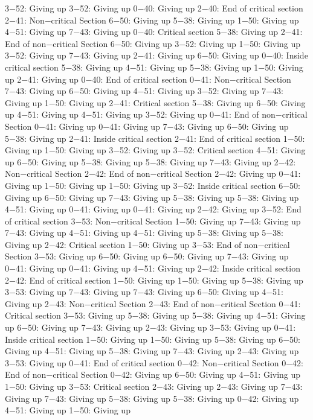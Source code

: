 3−52: Giving up
3−52: Giving up
0−40: Giving up
2−40: End of critical section
2−41: Non−critical Section
6−50: Giving up
5−38: Giving up
1−50: Giving up
4−51: Giving up
7−43: Giving up
0−40: Critical section
5−38: Giving up
2−41: End of non−critical Section
6−50: Giving up
3−52: Giving up
1−50: Giving up
3−52: Giving up
7−43: Giving up
2−41: Giving up
6−50: Giving up
0−40: Inside critical section
5−38: Giving up
4−51: Giving up
5−38: Giving up
1−50: Giving up
2−41: Giving up
0−40: End of critical section
0−41: Non−critical Section
7−43: Giving up
6−50: Giving up
4−51: Giving up
3−52: Giving up
7−43: Giving up
1−50: Giving up
2−41: Critical section
5−38: Giving up
6−50: Giving up
4−51: Giving up
4−51: Giving up
3−52: Giving up
0−41: End of non−critical Section
0−41: Giving up
0−41: Giving up
7−43: Giving up
6−50: Giving up
5−38: Giving up
2−41: Inside critical section
2−41: End of critical section
1−50: Giving up
1−50: Giving up
3−52: Giving up
3−52: Critical section
4−51: Giving up
6−50: Giving up
5−38: Giving up
5−38: Giving up
7−43: Giving up
2−42: Non−critical Section
2−42: End of non−critical Section
2−42: Giving up
0−41: Giving up
1−50: Giving up
1−50: Giving up
3−52: Inside critical section
6−50: Giving up
6−50: Giving up
7−43: Giving up
5−38: Giving up
5−38: Giving up
4−51: Giving up
0−41: Giving up
0−41: Giving up
2−42: Giving up
3−52: End of critical section
3−53: Non−critical Section
1−50: Giving up
7−43: Giving up
7−43: Giving up
4−51: Giving up
4−51: Giving up
5−38: Giving up
5−38: Giving up
2−42: Critical section
1−50: Giving up
3−53: End of non−critical Section
3−53: Giving up
6−50: Giving up
6−50: Giving up
7−43: Giving up
0−41: Giving up
0−41: Giving up
4−51: Giving up
2−42: Inside critical section
2−42: End of critical section
1−50: Giving up
1−50: Giving up
5−38: Giving up
3−53: Giving up
7−43: Giving up
7−43: Giving up
6−50: Giving up
4−51: Giving up
2−43: Non−critical Section
2−43: End of non−critical Section
0−41: Critical section
3−53: Giving up
5−38: Giving up
5−38: Giving up
4−51: Giving up
6−50: Giving up
7−43: Giving up
2−43: Giving up
3−53: Giving up
0−41: Inside critical section
1−50: Giving up
1−50: Giving up
5−38: Giving up
6−50: Giving up
4−51: Giving up
5−38: Giving up
7−43: Giving up
2−43: Giving up
3−53: Giving up
0−41: End of critical section
0−42: Non−critical Section
0−42: End of non−critical Section
0−42: Giving up
6−50: Giving up
4−51: Giving up
1−50: Giving up
3−53: Critical section
2−43: Giving up
2−43: Giving up
7−43: Giving up
7−43: Giving up
5−38: Giving up
5−38: Giving up
0−42: Giving up
4−51: Giving up
1−50: Giving up
